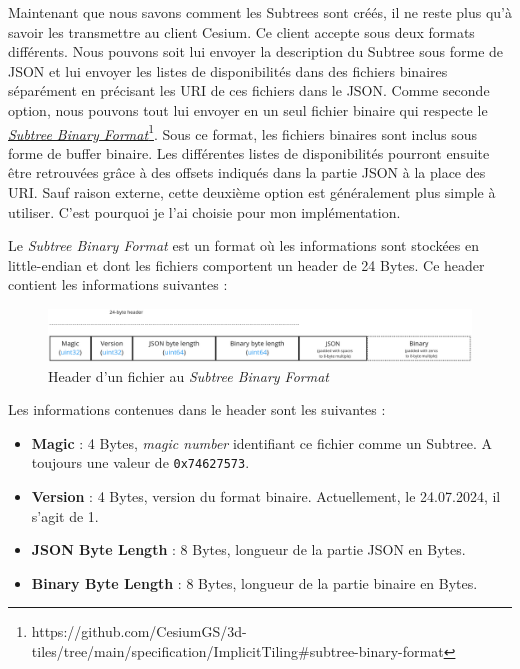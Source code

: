 Maintenant que nous savons comment les Subtrees sont créés, il ne reste plus qu'à savoir les transmettre au client Cesium. Ce client accepte sous deux formats différents. Nous pouvons soit lui envoyer la description du Subtree sous forme de JSON et lui envoyer les listes de disponibilités dans des fichiers binaires séparément en précisant les URI de ces fichiers dans le JSON. Comme seconde option, nous pouvons tout lui envoyer en un seul fichier binaire qui respecte le \href{https://github.com/CesiumGS/3d-tiles/tree/main/specification/ImplicitTiling#subtree-binary-format}{\textit{Subtree Binary Format}}\footnote{https://github.com/CesiumGS/3d-tiles/tree/main/specification/ImplicitTiling\#subtree-binary-format}. Sous ce format, les fichiers binaires sont inclus sous forme de buffer binaire. Les différentes listes de disponibilités pourront ensuite être retrouvées grâce à des offsets indiqués dans la partie JSON à la place des URI. Sauf raison externe, cette deuxième option est généralement plus simple à utiliser. C'est pourquoi je l'ai choisie pour mon implémentation.

Le \textit{Subtree Binary Format} est un format où les informations sont stockées en little-endian et dont les fichiers comportent un header de 24 Bytes. Ce header contient les informations suivantes :

\begin{figure}[H]
    \centering
    \includegraphics[width=1\textwidth]{assets/figures/binary-subtree.png}
    \caption{Header d'un fichier au \textit{Subtree Binary Format} \cite{implicit-tiling-gh}}
    \label{fig:xy-morton}
\end{figure}

Les informations contenues dans le header sont les suivantes :

\begin{itemize}
    \item \textbf{Magic} : 4 Bytes, \textit{magic number} identifiant ce fichier comme un Subtree. A toujours une valeur de \texttt{0x74627573}.
    \item \textbf{Version} : 4 Bytes, version du format binaire. Actuellement, le 24.07.2024, il s'agit de 1.
    \item \textbf{JSON Byte Length} : 8 Bytes, longueur de la partie JSON en Bytes.
    \item \textbf{Binary Byte Length} : 8 Bytes, longueur de la partie binaire en Bytes.
\end{itemize}

